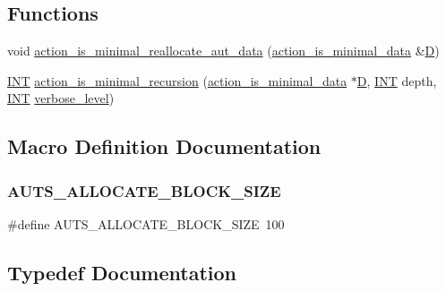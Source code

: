 \subsection*{Functions}
\begin{DoxyCompactItemize}
\item 
void \mbox{\hyperlink{backtrack_8_c_a275c8ab9b20fbd42425ce49d48b04011}{action\+\_\+is\+\_\+minimal\+\_\+reallocate\+\_\+aut\+\_\+data}} (\mbox{\hyperlink{structaction__is__minimal__data}{action\+\_\+is\+\_\+minimal\+\_\+data}} \&\mbox{\hyperlink{costas_8_c_af13967e8da5ae214c112fd612639beaa}{D}})
\item 
\mbox{\hyperlink{galois_8h_a09fddde158a3a20bd2dcadb609de11dc}{I\+NT}} \mbox{\hyperlink{backtrack_8_c_a424c8d4e6a3d42ba176e2deec17dda30}{action\+\_\+is\+\_\+minimal\+\_\+recursion}} (\mbox{\hyperlink{structaction__is__minimal__data}{action\+\_\+is\+\_\+minimal\+\_\+data}} $\ast$\mbox{\hyperlink{costas_8_c_af13967e8da5ae214c112fd612639beaa}{D}}, \mbox{\hyperlink{galois_8h_a09fddde158a3a20bd2dcadb609de11dc}{I\+NT}} depth, \mbox{\hyperlink{galois_8h_a09fddde158a3a20bd2dcadb609de11dc}{I\+NT}} \mbox{\hyperlink{simeon_8_c_a818073fbcc2f439e7c56952f67386122}{verbose\+\_\+level}})
\end{DoxyCompactItemize}


\subsection{Macro Definition Documentation}
\mbox{\label{backtrack_8_c_a91161d46c219929445a06b9c9fc3f9fa}} 
\subsubsection{\texorpdfstring{A\+U\+T\+S\+\_\+\+A\+L\+L\+O\+C\+A\+T\+E\+\_\+\+B\+L\+O\+C\+K\+\_\+\+S\+I\+ZE}{AUTS\_ALLOCATE\_BLOCK\_SIZE}}
{\footnotesize\ttfamily \#define A\+U\+T\+S\+\_\+\+A\+L\+L\+O\+C\+A\+T\+E\+\_\+\+B\+L\+O\+C\+K\+\_\+\+S\+I\+ZE~100}



\subsection{Typedef Documentation}
\mbox{\label{backtrack_8_c_ac80b083745bb82fa4ed03aaba4150631}} 
